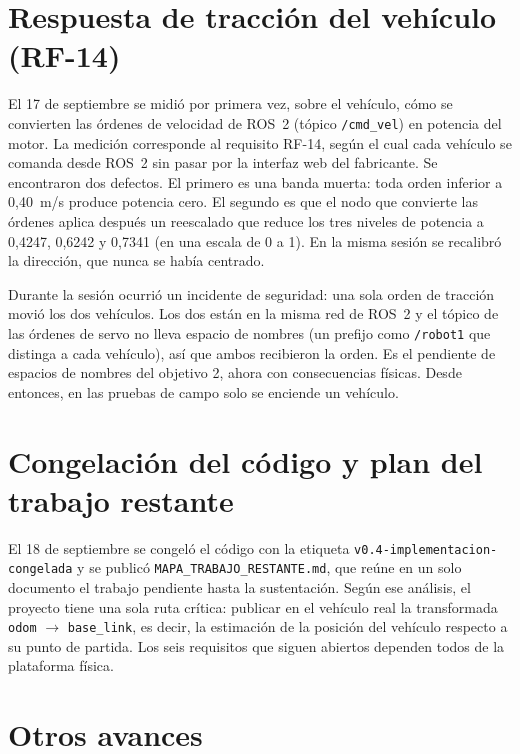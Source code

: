 \documentclass[12pt,letterpaper]{article}
\begin{document}
\section{Respuesta de tracción del vehículo (RF-14)}
\label{sec:rf14}

El 17 de septiembre se midió por primera vez, sobre el vehículo, cómo se convierten las órdenes de velocidad de ROS~2 (tópico \texttt{/cmd\_vel}) en potencia del motor. La medición corresponde al requisito RF-14, según el cual cada vehículo se comanda desde ROS~2 sin pasar por la interfaz web del fabricante. Se encontraron dos defectos. El primero es una banda muerta: toda orden inferior a 0,40~m/s produce potencia cero. El segundo es que el nodo que convierte las órdenes aplica después un reescalado que reduce los tres niveles de potencia a 0,4247, 0,6242 y 0,7341 (en una escala de 0 a 1). En la misma sesión se recalibró la dirección, que nunca se había centrado.

Durante la sesión ocurrió un incidente de seguridad: una sola orden de tracción movió los dos vehículos. Los dos están en la misma red de ROS~2 y el tópico de las órdenes de servo no lleva espacio de nombres (un prefijo como \texttt{/robot1} que distinga a cada vehículo), así que ambos recibieron la orden. Es el pendiente de espacios de nombres del objetivo 2, ahora con consecuencias físicas. Desde entonces, en las pruebas de campo solo se enciende un vehículo.

\section{Congelación del código y plan del trabajo restante}
\label{sec:congelacion}

El 18 de septiembre se congeló el código con la etiqueta \texttt{v0.4-implementacion-congelada} y se publicó \texttt{MAPA\_TRABAJO\_RESTANTE.md}, que reúne en un solo documento el trabajo pendiente hasta la sustentación. Según ese análisis, el proyecto tiene una sola ruta crítica: publicar en el vehículo real la transformada \texttt{odom} $\rightarrow$ \texttt{base\_link}, es decir, la estimación de la posición del vehículo respecto a su punto de partida. Los seis requisitos que siguen abiertos dependen todos de la plataforma física.

\section{Otros avances}
\label{sec:otros}
\end{document}
